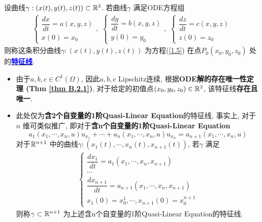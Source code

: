 	\vspace*{1em}
	
	\begin{defn}\label{def 1.2.2}
		设曲线$\gamma : (x(t) , y(t) , z(t)) \subset \mathbb{R}^3$. 若曲线$\gamma$ 满足ODE方程组
		\begin{align}
			\begin{cases}
				\dfrac{dx}{dt} = a(x , y , z) \\
				x(0) = x_0
			\end{cases} , \,\, 
			\begin{cases}
				\dfrac{dy}{dt} = b(x , y , z) \\
				y(0) = y_0
			\end{cases} , \,\, 
			\begin{cases}
				\dfrac{dz}{dt} = c(x , y , z) \\
				z(0) = z_0
			\end{cases}\label{1.6}
		\end{align}
		则称这条积分曲线$\gamma : (x(t) , y(t) , z(t))$ 为方程(\ref{1.5}) 在点$P_0(x_0 , y_0 , z_0)$ 处的\underline{\textcolor{blue}{\textbf{特征线}}}. 
		
		\vspace*{2em}
		
		\begin{rmk}
			\begin{itemize}
				\item 由于$a , b , c \in C^1(\Omega)$, 因此$a , b , c$  Lipschitz连续, 根据\textbf{ODE解的存在唯一性定理 (Thm \ref{thm B.2.1})}, 对于给定的初值点$(x_0 , y_0 , z_0) \in \mathbb{R}^3$, 该特征线\textbf{存在且唯一}. 
				
				\vspace*{2em}
				
				\item 此处仅为\textbf{含2个自变量的1阶Quasi-Linear Equation}的特征线, 事实上, 对于$n$ 维可类似推广, 即对于\textbf{含n个自变量的1阶Quasi-Linear Equation}
				\[ a_1(x_1 , \cdots , x_n , u)u_{x_1} + \cdots + a_{n}(x_1 , \cdots , x_n , u)u_{x_n} = a_{n + 1}(x_1 , \cdots , x_n , u) \]
				对于$\mathbb{R}^{n + 1}$ 中的曲线$\gamma : (x_1(t) , \cdots , x_n (t) , x_{n + 1}(t))$, 若$\gamma$ 满足
				\begin{align*}
					\begin{cases}
						\dfrac{dx_{1}}{dt} = a_1(x_1 , \cdots , x_n , x_{n + 1}) \\
						\cdots \\
						\dfrac{dx_{n + 1}}{dt} = a_{n + 1}(x_1 , \cdots , x_n , x_{n + 1}) \\
						x_1(0) = x_{0}^1 , \cdots , x_{n + 1}(0) = x_{0}^{n + 1}
					\end{cases}
				\end{align*}
				则称$\gamma \subset \mathbb{R}^{n + 1}$ 为上述含n个自变量的1阶Quasi-Linear Equation的特征线. 
			\end{itemize}
		\end{rmk}
	\end{defn}

